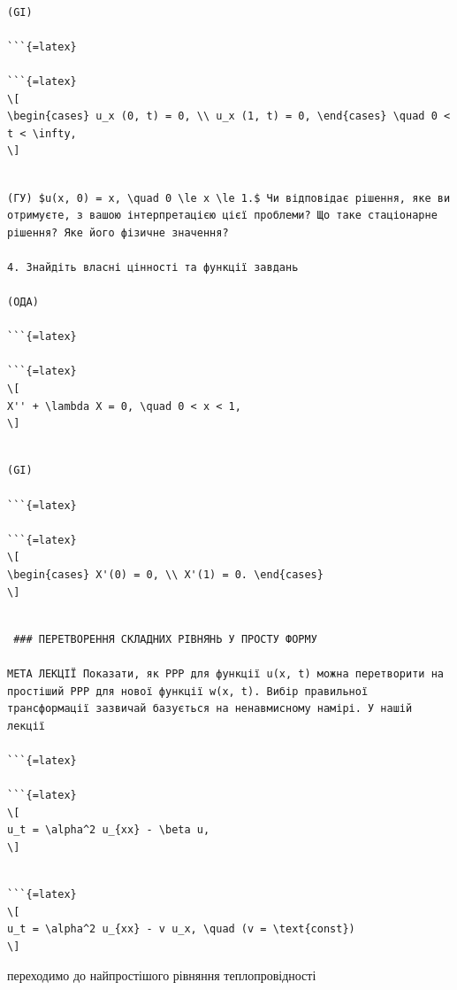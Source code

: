 \documentclass[
  ukrainian,
]{article}
\begin{document}
\begin{verbatim}

(GI)

```{=latex}

```{=latex}
\[
\begin{cases} u_x (0, t) = 0, \\ u_x (1, t) = 0, \end{cases} \quad 0 < t < \infty,
\]
\end{verbatim}

\begin{verbatim}

(ГУ) $u(x, 0) = x, \quad 0 \le x \le 1.$ Чи відповідає рішення, яке ви отримуєте, з вашою інтерпретацією цієї проблеми? Що таке стаціонарне рішення? Яке його фізичне значення?

4. Знайдіть власні цінності та функції завдань

(ОДА)

```{=latex}

```{=latex}
\[
X'' + \lambda X = 0, \quad 0 < x < 1,
\]
\end{verbatim}

\begin{verbatim}

(GI) 

```{=latex}

```{=latex}
\[
\begin{cases} X'(0) = 0, \\ X'(1) = 0. \end{cases}
\]
\end{verbatim}

\begin{verbatim}

 ### ПЕРЕТВОРЕННЯ СКЛАДНИХ РІВНЯНЬ У ПРОСТУ ФОРМУ

МЕТА ЛЕКЦІЇ Показати, як PPP для функції u(x, t) можна перетворити на простіший PPP для нової функції w(x, t). Вибір правильної трансформації зазвичай базується на ненавмисному намірі. У нашій лекції

```{=latex}

```{=latex}
\[
u_t = \alpha^2 u_{xx} - \beta u,
\]
\end{verbatim}

\begin{verbatim}

```{=latex}
\[
u_t = \alpha^2 u_{xx} - v u_x, \quad (v = \text{const})
\]
\end{verbatim}

переходимо до найпростішого рівняння теплопровідності
\end{document}
